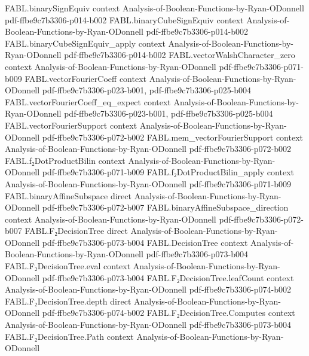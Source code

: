 \begin{theorem}
\proofstep
  {FABL.binarySignEquiv}
  {context}
  {Analysis-of-Boolean-Functions-by-Ryan-ODonnell}
  {pdf-ffbe9c7b3306-p014-b002}
\proofstep
  {FABL.binaryCubeSignEquiv}
  {context}
  {Analysis-of-Boolean-Functions-by-Ryan-ODonnell}
  {pdf-ffbe9c7b3306-p014-b002}
\proofstep
  {FABL.binaryCubeSignEquiv_apply}
  {context}
  {Analysis-of-Boolean-Functions-by-Ryan-ODonnell}
  {pdf-ffbe9c7b3306-p014-b002}
\proofstep
  {FABL.vectorWalshCharacter_zero}
  {context}
  {Analysis-of-Boolean-Functions-by-Ryan-ODonnell}
  {pdf-ffbe9c7b3306-p071-b009}
\proofstep
  {FABL.vectorFourierCoeff}
  {context}
  {Analysis-of-Boolean-Functions-by-Ryan-ODonnell}
  {pdf-ffbe9c7b3306-p023-b001,
    pdf-ffbe9c7b3306-p025-b004}
\proofstep
  {FABL.vectorFourierCoeff_eq_expect}
  {context}
  {Analysis-of-Boolean-Functions-by-Ryan-ODonnell}
  {pdf-ffbe9c7b3306-p023-b001,
    pdf-ffbe9c7b3306-p025-b004}
\proofstep
  {FABL.vectorFourierSupport}
  {context}
  {Analysis-of-Boolean-Functions-by-Ryan-ODonnell}
  {pdf-ffbe9c7b3306-p072-b002}
\proofstep
  {FABL.mem_vectorFourierSupport}
  {context}
  {Analysis-of-Boolean-Functions-by-Ryan-ODonnell}
  {pdf-ffbe9c7b3306-p072-b002}
\proofstep
  {FABL.f₂DotProductBilin}
  {context}
  {Analysis-of-Boolean-Functions-by-Ryan-ODonnell}
  {pdf-ffbe9c7b3306-p071-b009}
\proofstep
  {FABL.f₂DotProductBilin_apply}
  {context}
  {Analysis-of-Boolean-Functions-by-Ryan-ODonnell}
  {pdf-ffbe9c7b3306-p071-b009}
\proofstep
  {FABL.binaryAffineSubspace}
  {direct}
  {Analysis-of-Boolean-Functions-by-Ryan-ODonnell}
  {pdf-ffbe9c7b3306-p072-b007}
\proofstep
  {FABL.binaryAffineSubspace_direction}
  {context}
  {Analysis-of-Boolean-Functions-by-Ryan-ODonnell}
  {pdf-ffbe9c7b3306-p072-b007}
\proofstep
  {FABL.F₂DecisionTree}
  {direct}
  {Analysis-of-Boolean-Functions-by-Ryan-ODonnell}
  {pdf-ffbe9c7b3306-p073-b004}
\proofstep
  {FABL.DecisionTree}
  {context}
  {Analysis-of-Boolean-Functions-by-Ryan-ODonnell}
  {pdf-ffbe9c7b3306-p073-b004}
\proofstep
  {FABL.F₂DecisionTree.eval}
  {context}
  {Analysis-of-Boolean-Functions-by-Ryan-ODonnell}
  {pdf-ffbe9c7b3306-p073-b004}
\proofstep
  {FABL.F₂DecisionTree.leafCount}
  {context}
  {Analysis-of-Boolean-Functions-by-Ryan-ODonnell}
  {pdf-ffbe9c7b3306-p074-b002}
\proofstep
  {FABL.F₂DecisionTree.depth}
  {direct}
  {Analysis-of-Boolean-Functions-by-Ryan-ODonnell}
  {pdf-ffbe9c7b3306-p074-b002}
\proofstep
  {FABL.F₂DecisionTree.Computes}
  {context}
  {Analysis-of-Boolean-Functions-by-Ryan-ODonnell}
  {pdf-ffbe9c7b3306-p073-b004}
\proofstep
  {FABL.F₂DecisionTree.Path}
  {context}
  {Analysis-of-Boolean-Functions-by-Ryan-ODonnell}

\end{theorem}
